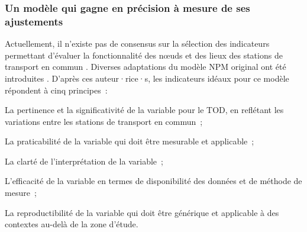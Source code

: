 \begin{refsegment}
\subsubsection*{Un modèle qui gagne en précision à mesure de ses ajustements
    \label{chap6:litterature-indicateurs}
    }

Actuellement, il n'existe pas de consensus sur la sélection des indicateurs permettant d'évaluer la fonctionnalité des nœuds et des lieux des stations de transport en commun \textcolor{blue}{\autocites[446]{chen_node-place_2015}[194]{reusser_classifying_2008}}. Diverses adaptations du modèle \acrshort{NPM} original ont été introduites \textcolor{blue}{\autocites[2]{lee_passive_2024}[20]{lukman_development_2014}}. D'après ces auteur·rice·s, les indicateurs idéaux pour ce modèle répondent à cinq principes~:
\begin{customitemize}
    \item La pertinence et la significativité de la variable pour le \acrshort{TOD}, en reflétant les variations entre les stations de transport en commun~;
    \item La praticabilité de la variable qui doit être mesurable et applicable~;
    \item La clarté de l'interprétation de la variable~;
    \item L'efficacité de la variable en termes de disponibilité des données et de méthode de mesure~;
    \item La reproductibilité de la variable qui doit être générique et applicable à des contextes au-delà de la zone d'étude.
\end{customitemize}%


\end{refsegment}
